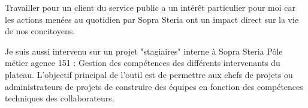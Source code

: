 Travailler pour un client du service public a un intérêt particulier pour moi car les actions menées au quotidien par Sopra Steria ont un impact direct sur la vie de nos concitoyens.

Je suis aussi intervenu sur un projet "stagiaires" interne à Sopra Steria Pôle métier agence 151 : Gestion des compétences des différents intervenants du plateau. L'objectif principal de l'outil est de permettre aux chefs de projets ou administrateurs de projets de construire des équipes en fonction des compétences techniques des collaborateurs.

